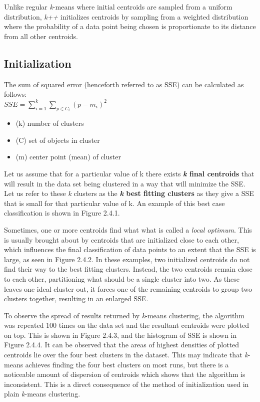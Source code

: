 \documentclass[12pt]{article}
\begin{document}
  \par Unlike regular \textit{k}-means where initial centroids are sampled from a uniform distribution, \textit{k++} initializes centroids by sampling from a weighted distribution where the probability of a data point being chosen is proportionate to its distance from all other centroids.
\subsection {Initialization}
  The sum of squared error (henceforth referred to as SSE) can be calculated as follows:\\
  $SSE = \sum \limits_{i=1}^k \sum \limits_{p \in C_i} (p-m_i)^2$
  \begin{itemize}
    \item (k) number of clusters
    \item (C) set of objects in cluster
    \item (m) center point (mean) of cluster
  \end{itemize}

  \par Let us assume that for a particular value of k there exists \textbf{\textit{k} final centroids} that will result in the data set being clustered in a way that will minimize the SSE. Let us refer to these \textit{k} clusters as the \textbf{\textit{k} best fitting clusters} as they give a SSE that is small for that particular value of k. An example of this best case classification is shown in Figure 2.4.1.

  \par Sometimes, one or more centroids find what what is called a \textit{local optimum}. This is usually brought about by centroids that are initialized close to each other, which influences the final classification of data points to an extent that the SSE is large, as seen in Figure 2.4.2. In these examples, two initialized centroids do not find their way to the best fitting clusters. Instead, the two centroids remain close to each other, partitioning what should be a single cluster into two. As these leaves one ideal cluster out, it forces one of the remaining centroids to group two clusters together, resulting in an enlarged SSE.

  \par To observe the spread of results returned by \textit{k}-means clustering, the algorithm was repeated 100 times on the data set and the resultant centroids were plotted on top. This is shown in Figure 2.4.3, and the histogram of SSE is shown in Figure 2.4.4. It can be observed that the areas of highest densities of plotted centroids lie over the four best clusters in the dataset. This may indicate that \textit{k}-means achieves finding the four best clusters on most runs, but there is a noticeable amount of dispersion of centroids which shows that the algorithm is inconsistent. This is a direct consequence of the method of initialization used in plain \textit{k}-means clustering.
\end{document}
